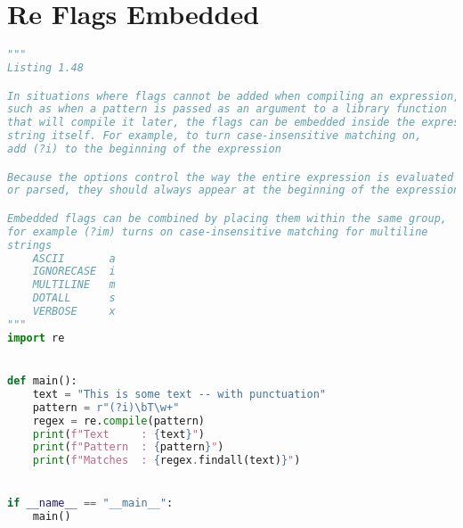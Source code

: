 \documentclass[a4paper,landscape]{report}
\begin{document}
\section{Re Flags Embedded}
\begin{lstlisting}[language=Python]
"""
Listing 1.48

In situations where flags cannot be added when compiling an expression,
such as when a pattern is passed as an argument to a library function
that will compile it later, the flags can be embedded inside the expression
string itself. For example, to turn case-insensitive matching on,
add (?i) to the beginning of the expression

Because the options control the way the entire expression is evaluated
or parsed, they should always appear at the beginning of the expression

Embedded flags can be combined by placing them within the same group,
for example (?im) turns on case-insensitive matching for multiline
strings
    ASCII       a
    IGNORECASE  i
    MULTILINE   m
    DOTALL      s
    VERBOSE     x
"""
import re


def main():
    text = "This is some text -- with punctuation"
    pattern = r"(?i)\bT\w+"
    regex = re.compile(pattern)
    print(f"Text     : {text}")
    print(f"Pattern  : {pattern}")
    print(f"Matches  : {regex.findall(text)}")


if __name__ == "__main__":
    main()

\end{lstlisting}
\end{document}
